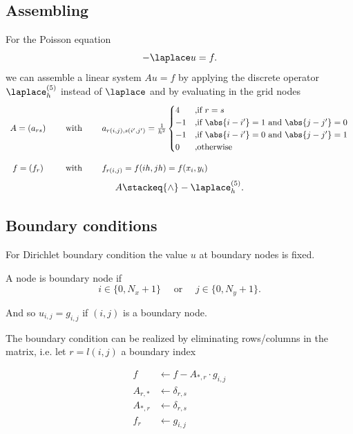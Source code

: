 \subsection{Assembling}%
\label{sec:Assembling}

For the Poisson equation
\[
-\laplace u = f
.\] 
we can assemble a linear system $Au=f$ by applying the discrete operator $\laplace_{h}^{(5)}$ instead of $\laplace$ and by evaluating in the grid nodes
\[
	\begin{array}{ccl}
	A = (a_{rs}) 
	\quad&\text{ with }\quad 
	&a_{r(i,j),s(i',j')}= \frac{1}{h^{2}}\begin{cases}
		4 &\text{,if } r=s \\
		-1 &\text{,if } \abs{i-i'} = 1 \text{ and } \abs{j-j'} = 0 \\
		-1 &\text{,if } \abs{i-i'} = 0 \text{ and } \abs{j-j'} = 1 \\
		0 &\text{,otherwise}
	\end{cases} \\ \\
	f = (f_{r}) 
	\quad&\text{ with }\quad
	&f_{r(i,j)}=f(ih, jh)=f(x_{i}, y_{i})
	\end{array}
\] 
\[
	 A \stackeq{\wedge} -\laplace_{h}^{(5)}
.\] 

\subsection{Boundary conditions}%
\label{sec:Boundary condition}
For Dirichlet boundary condition the value $u$ at boundary nodes is fixed.

A node is boundary node if
\[
i \in  \{0, N_{x}+1\} \quad\text{ or }\quad j \in  \{0,N_{y}+1\}
.\] 

And so $u_{i,j} = g_{i,j}$ if $(i,j)$ is a boundary node.

The boundary condition can be realized by eliminating rows/columns in the matrix, i.e. let $r=l(i,j)$ a boundary index

\begin{align*}
	f &\leftarrow f-A_{\ast,r}\cdot g_{i,j} \\
	A_{r,\ast} &\leftarrow \delta_{r,s} \\
	A_{*,r} &\leftarrow \delta_{r,s} \\
	f_{r} &\leftarrow g_{i,j}
\end{align*}

